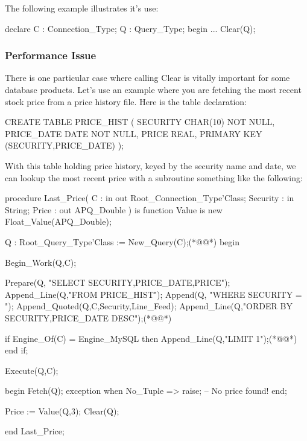 \documentclass[english,letterpaper]{book}
\begin{document}
The following example illustrates it's use:

\begin{Example}
declare
   C : Connection_Type;
   Q : Query_Type;
begin
   ...
   Clear(Q);
\end{Example}

\subsubsection{Performance Issue}

There is one particular case where calling Clear is vitally important
for some database products. Let's use an example where you are fetching
the most recent stock price from a price history file. Here is the
table declaration:

\begin{SQL}
CREATE TABLE PRICE_HIST (
   SECURITY    CHAR(10) NOT NULL,
   PRICE_DATE  DATE NOT NULL,
   PRICE       REAL,
   PRIMARY KEY (SECURITY,PRICE_DATE)
);
\end{SQL}

With this table holding price history, keyed by the security name
and date, we can lookup the most recent price with a subroutine something
like the following:

\begin{NumberedExample}
procedure Last_Price(
   C :        in out Root_Connection_Type'Class;
   Security : in     String;
   Price :       out APQ_Double
) is
   function Value is new Float_Value(APQ_Double);

   Q : Root_Query_Type'Class := New_Query(C);(*@\label{Ex:TheQ}@*)
begin

   Begin_Work(Q,C);

   Prepare(Q,    "SELECT SECURITY,PRICE_DATE,PRICE");
   Append_Line(Q,"FROM PRICE_HIST");
   Append(Q,     "WHERE SECURITY = ");
   Append_Quoted(Q,C,Security,Line_Feed);
   Append_Line(Q,"ORDER BY SECURITY,PRICE_DATE DESC");(*@\label{Ex:OrderBy}@*)

   if Engine_Of(C) = Engine_MySQL then
      Append_Line(Q,"LIMIT 1");(*@\label{Ex:Limit1}@*)
   end if;

   Execute(Q,C);

   begin
      Fetch(Q);
   exception
      when No_Tuple =>
         raise;   -- No price found!
   end;

   Price := Value(Q,3);
   Clear(Q);\label{Ex:Clear}

end Last_Price;
\end{NumberedExample}
\end{document}
